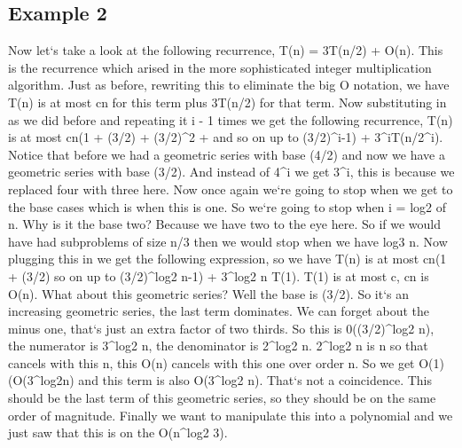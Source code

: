 \subsection{Example 2}
Now let`s take a look at the following recurrence, T(n) = 3T(n/2) + O(n).
This is the recurrence which arised in the more sophisticated integer multiplication algorithm.
Just as before, rewriting this to eliminate the big O notation, we have T(n) is at most cn for this term plus 3T(n/2) for that term.
Now substituting in as we did before and repeating it i - 1 times we get the following recurrence, T(n) is at most cn(1 + (3/2) + (3/2)\textasciicircum{}2 + and so on up to (3/2)\textasciicircum{}i-1) + 3\textasciicircum{}iT(n/2\textasciicircum{}i).
Notice that before we had a geometric series with base (4/2) and now we have a geometric series with base (3/2).
And instead of 4\textasciicircum{}i we get 3\textasciicircum{}i, this is because we replaced four with three here.
Now once again we`re going to stop when we get to the base cases which is when this is one.
So we`re going to stop when i = log2 of n.
Why is it the base two? Because we have two to the eye here.
So if we would have had subproblems of size n/3 then we would stop when we have log3 n.
Now plugging this in we get the following expression, so we have T(n) is at most cn(1 + (3/2) so on up to (3/2)\textasciicircum{}log2 n-1) + 3\textasciicircum{}log2 n T(1).
T(1) is at most c, cn is O(n).
What about this geometric series? Well the base is (3/2).
So it`s an increasing geometric series, the last term dominates.
We can forget about the minus one, that`s just an extra factor of two thirds.
So this is 0((3/2)\textasciicircum{}log2 n), the numerator is 3\textasciicircum{}log2 n, the denominator is 2\textasciicircum{}log2 n. 2\textasciicircum{}log2 n is n so that cancels with this n, this O(n) cancels with this one over order n.
So we get O(1) (O(3\textasciicircum{}log2n) and this term is also O(3\textasciicircum{}log2 n).
That`s not a coincidence.
This should be the last term of this geometric series, so they should be on the same order of magnitude.
Finally we want to manipulate this into a polynomial and we just saw that this is on the O(n\textasciicircum{}log2 3).

